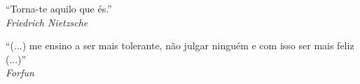 \begin{titlepage}
 \vspace*{5cm}
 \begin{flushright}
  ``Torna-te aquilo que és.''\\\textit{Friedrich Nietzsche}
  \vspace{1cm}
 \end{flushright}

 \begin{flushright}
  ``(...) me ensino a ser mais tolerante, não julgar ninguém e com isso ser mais feliz (...)''\\\textit{Forfun}
  \vspace{1cm}
 \end{flushright}
\end{titlepage}

